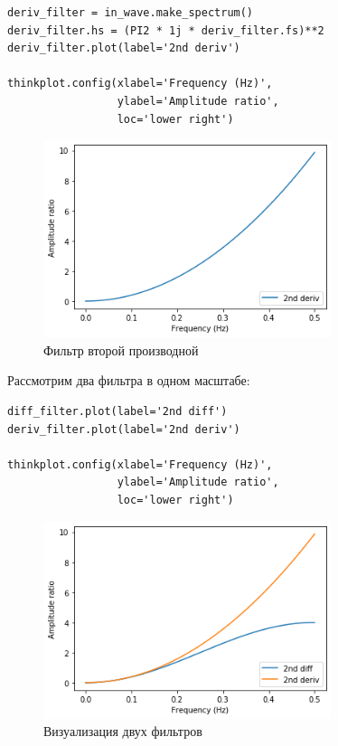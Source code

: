\documentclass[a4paper,12pt]{report}
\begin{document}
\begin{lstlisting}[caption=Фильтр второй производной]
deriv_filter = in_wave.make_spectrum()
deriv_filter.hs = (PI2 * 1j * deriv_filter.fs)**2
deriv_filter.plot(label='2nd deriv')

thinkplot.config(xlabel='Frequency (Hz)',
                 ylabel='Amplitude ratio',
                 loc='lower right')
\end{lstlisting}

\begin{figure}[H]
        \centering
        \includegraphics[width=0.75\textwidth]{lab9_fig5_6.png}
        \caption{Фильтр второй производной}
        \label{fig:lab9_fig5_6}
\end{figure}

Рассмотрим два фильтра в одном масштабе:

\begin{lstlisting}[caption=Визуализация двух фильтров]
diff_filter.plot(label='2nd diff')
deriv_filter.plot(label='2nd deriv')

thinkplot.config(xlabel='Frequency (Hz)',
                 ylabel='Amplitude ratio',
                 loc='lower right')
\end{lstlisting}

\begin{figure}[H]
        \centering
        \includegraphics[width=0.75\textwidth]{lab9_fig5_7.png}
        \caption{Визуализация двух фильтров}
        \label{fig:lab9_fig5_7}
\end{figure}
\end{document}

